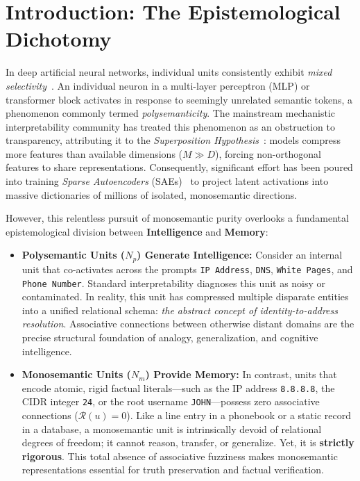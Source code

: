 \documentclass[11pt,a4paper]{article}
\theoremstyle{definition}
\begin{document}
\section{Introduction: The Epistemological Dichotomy}

In deep artificial neural networks, individual units consistently exhibit \textit{mixed selectivity}~\cite{rigotti2013importance, elhage2022toy}. An individual neuron in a multi-layer perceptron (MLP) or transformer block activates in response to seemingly unrelated semantic tokens, a phenomenon commonly termed \textit{polysemanticity}. The mainstream mechanistic interpretability community has treated this phenomenon as an obstruction to transparency, attributing it to the \textit{Superposition Hypothesis}~\cite{elhage2022toy}: models compress more features than available dimensions ($M \gg D$), forcing non-orthogonal features to share representations. Consequently, significant effort has been poured into training \textit{Sparse Autoencoders} (SAEs)~\cite{bricken2023monosemanticity, templeton2024scaling, cunningham2023sparse} to project latent activations into massive dictionaries of millions of isolated, monosemantic directions.

However, this relentless pursuit of monosemantic purity overlooks a fundamental epistemological division between \textbf{Intelligence} and \textbf{Memory}:
\begin{itemize}[leftmargin=*, itemsep=2.0pt, topsep=2.5pt]
    \item \textbf{Polysemantic Units ($N_p$) Generate Intelligence:} Consider an internal unit that co-activates across the prompts \texttt{IP Address}, \texttt{DNS}, \texttt{White Pages}, and \texttt{Phone Number}. Standard interpretability diagnoses this unit as noisy or contaminated. In reality, this unit has compressed multiple disparate entities into a unified relational schema: \textit{the abstract concept of identity-to-address resolution}. Associative connections between otherwise distant domains are the precise structural foundation of analogy, generalization, and cognitive intelligence.
    \item \textbf{Monosemantic Units ($N_m$) Provide Memory:} In contrast, units that encode atomic, rigid factual literals---such as the IP address \texttt{8.8.8.8}, the CIDR integer \texttt{24}, or the root username \texttt{JOHN}---possess zero associative connections ($\mathcal{R}(u)=0$). Like a line entry in a phonebook or a static record in a database, a monosemantic unit is intrinsically devoid of relational degrees of freedom; it cannot reason, transfer, or generalize. Yet, it is \textbf{strictly rigorous}. This total absence of associative fuzziness makes monosemantic representations essential for truth preservation and factual verification.
\end{itemize}
\end{document}
